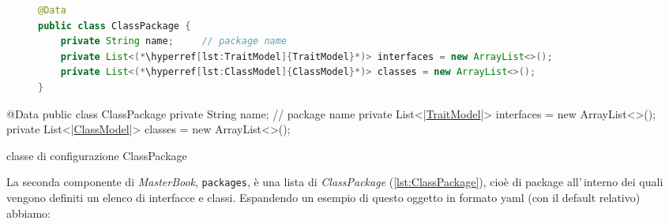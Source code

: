 \ifesource
\begin{figure*}[!htb]
\begin{lstlisting}[language=java, caption=classe di configurazione ClassPackage, 
label=lst:ClassPackage]
@Data
public class ClassPackage {
    private String name;     // package name
    private List<(*\hyperref[lst:TraitModel]{TraitModel}*)> interfaces = new ArrayList<>();
    private List<(*\hyperref[lst:ClassModel]{ClassModel}*)> classes = new ArrayList<>();
}
\end{lstlisting}
\end{figure*}
\else
\begin{elisting}[!htb]
\begin{javacode}
@Data
public class ClassPackage {
    private String name;     // package name
    private List<|\hyperref[lst:TraitModel]{TraitModel}|> interfaces = new ArrayList<>();
    private List<|\hyperref[lst:ClassModel]{ClassModel}|> classes = new ArrayList<>();
}
\end{javacode}
\caption{classe di configurazione ClassPackage}
\label{lst:ClassPackage}
\end{elisting}
\fi
La seconda componente di \textsl{MasterBook}, \texttt{packages}, è una lista di
\textsl{ClassPackage} (\ref{lst:ClassPackage}), cioè di package all'\,in\-ter\-no
dei quali vengono definiti un elenco di interfacce e classi.
Espandendo un esempio di questo oggetto in formato yaml (con il default 
relativo) abbiamo:

